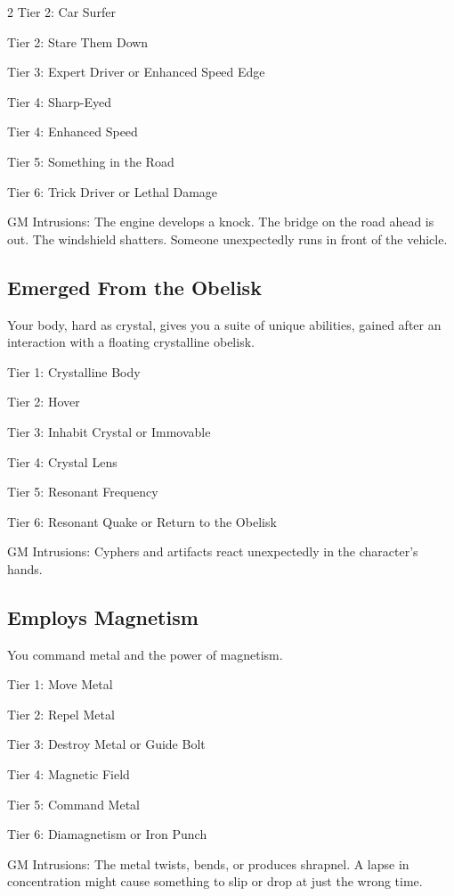 \begin{multicols}{2}
Tier 2: Car Surfer

Tier 2: Stare Them Down

Tier 3: Expert Driver or Enhanced Speed Edge

Tier 4: Sharp-Eyed

Tier 4: Enhanced Speed

Tier 5: Something in the Road

Tier 6: Trick Driver or Lethal Damage

GM Intrusions: The engine develops a knock. The bridge on the road ahead is out. The windshield shatters. Someone unexpectedly runs in front of the vehicle.

\subsection{Emerged From the Obelisk}

Your body, hard as crystal, gives you a suite of unique abilities, gained after an interaction with a floating crystalline obelisk.

Tier 1: Crystalline Body

Tier 2: Hover

Tier 3: Inhabit Crystal or Immovable

Tier 4: Crystal Lens

Tier 5: Resonant Frequency

Tier 6: Resonant Quake or Return to the Obelisk

GM Intrusions: Cyphers and artifacts react unexpectedly in the character’s hands.

\subsection{Employs Magnetism}

You command metal and the power of magnetism.

Tier 1: Move Metal

Tier 2: Repel Metal

Tier 3: Destroy Metal or Guide Bolt

Tier 4: Magnetic Field

Tier 5: Command Metal

Tier 6: Diamagnetism or Iron Punch 

GM Intrusions: The metal twists, bends, or produces shrapnel. A lapse in concentration might cause something to slip or drop at just the wrong time.


\end{multicols}
